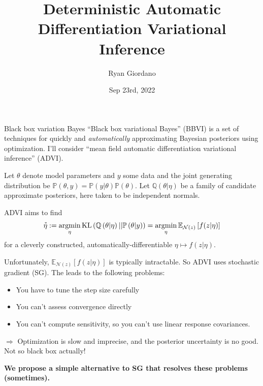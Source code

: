 \documentclass[8pt]{beamer}\usepackage[]{graphicx}\usepackage[]{color}
\title{Deterministic Automatic Differentiation Variational Inference}
\author{Ryan Giordano}
\date{Sep 23rd, 2022}
\institute{Massachusetts Institute of Technology}
\def\p#1{\mathbb{P}\left(#1\right)}
\def\q#1{\mathbb{Q}\left(#1\right)}
\def\y{y}
\def\z{z}
\def\normz{\mathcal{N}(z)}
\newcommand{\etastar}{\accentset{*}{\eta}}
\def\expect#1#2{\mathbb{E}_{#1}\left[#2\right]}
\def\kl#1{\mathrm{KL}\left(#1\right)}
\DeclareMathOperator*{\argmin}{\mathrm{argmin}}
\begin{document}

\begin{frame}{Black box variation Bayes}
%
``Black box variational Bayes'' (BBVI) is a set of techniques for quickly and
{\em automatically} approximating Bayesian posteriors using optimization. I'll
consider ``mean field automatic differentiation variational inference'' (ADVI).

Let $\theta$ denote model parameters and $\y$ some data and the joint
generating distribution be $\p{\theta, \y} = \p{\y \vert \theta} \p{\theta}$.
Let $\q{\theta \vert \eta}$ be a family of candidate approximate posteriors,
here taken to be independent normals.

ADVI aims to find
%
\begin{align*}
%
\etastar :=
    \argmin_{\eta} \kl{\q{\theta \vert \eta} || \p{\theta \vert \y}}
    = \argmin_{\eta} \expect{\normz}{f(\z  | \eta)}
%
\end{align*}
%
for a cleverly constructed, automatically-differentiable $\eta \mapsto f(\z |
\eta)$.

Unfortunately, $\expect{\normz}{f(\z  | \eta)}$ is typically intractable. So
ADVI uses stochastic gradient (SG).  The leads to the following problems:
%
\begin{itemize}
%
\item You have to tune the step size carefully
\item You can't assess convergence directly
\item You can't compute sensitivity, so you can't use linear response
covariances.
%
\end{itemize}
%
$\Rightarrow$ Optimization is slow and imprecise, and the posterior uncertainty
is no good.  Not so black box actually!

\textbf{
We propose a simple alternative to SG that resolves these
problems (sometimes).
}

%
\end{frame}



\end{document}
